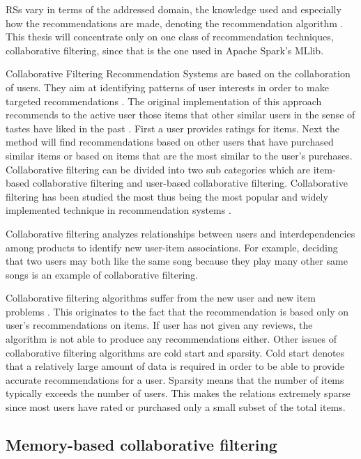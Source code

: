 \documentclass[main.tex]{thesis.tex}
\begin{document}
RSs vary in terms of the addressed domain, the knowledge used and especially how the recommendations are made, denoting the recommendation algorithm \cite{ricci11}.
This thesis will concentrate only on one class of recommendation techniques, collaborative filtering, since that is the one used in Apache Spark's MLlib.

Collaborative Filtering Recommendation Systems are based on the collaboration of users.
They aim at identifying patterns of user interests in order to make targeted recommendations \cite{aberger14}.
The original implementation of this approach recommends to the active user those items that other similar users in the sense of tastes have liked in the past \cite{ricci11}.
First a user provides ratings for items.
Next the method will find recommendations based on other users that have purchased similar items or based on items that are the most similar to the user's purchases.
Collaborative filtering can be divided into two sub categories which are item-based collaborative filtering and user-based collaborative filtering.
Collaborative filtering has been studied the most thus being the most popular and widely implemented technique in recommendation systems \cite{gorakala15} \cite{ricci11} \cite{burke02}.

Collaborative filtering analyzes relationships between users and interdependencies among products to identify new user-item associations. \cite{korenBellVolinsky09}
For example, deciding that two users may both like the same song because they play many other same songs is an example of collaborative filtering. \cite{ryza15}

Collaborative filtering algorithms suffer from the new user and new item problems \cite{gorakala15}.
This originates to the fact that the recommendation is based only on user's recommendations on items.
If user has not given any reviews, the algorithm is not able to produce any recommendations either.
Other issues of collaborative filtering algorithms are cold start and sparsity.
Cold start denotes that a relatively large amount of data is required in order to be able to provide accurate recommendations for a user.
Sparsity means that the number of items typically exceeds the number of users.
This makes the relations extremely sparse since most users have rated or purchased only a small subset of the total items. \cite{aberger14}

\subsection{Memory-based collaborative filtering}
\end{document}
